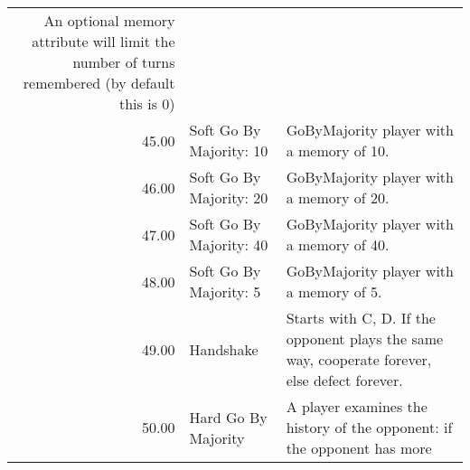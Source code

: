 \begin{tabular}{rll}
	An optional memory attribute will limit the number of turns remembered (by
	default this is 0)                                                                                                                                                                                                                                                                                                                                                                                                                                                                                                                                               \\
	45.00  & Soft Go By Majority: 10     & GoByMajority player with a memory of 10.                                                                                          \\
	46.00  & Soft Go By Majority: 20     & GoByMajority player with a memory of 20.                                                                                          \\
	47.00  & Soft Go By Majority: 40     & GoByMajority player with a memory of 40.                                                                                          \\
	48.00  & Soft Go By Majority: 5      & GoByMajority player with a memory of 5.                                                                                           \\
	49.00  & Handshake                   & Starts with C, D. If the opponent plays the same way, cooperate forever,
	else defect forever.                                                                                                                                                                                                                                                                                                                                                                                                                                                                                                                                                                                                                                                                                                                                                                                                                                                                                                                        \\
	50.00  & Hard Go By Majority         & A player examines the history of the opponent: if the opponent has more \\

\end{tabular}

